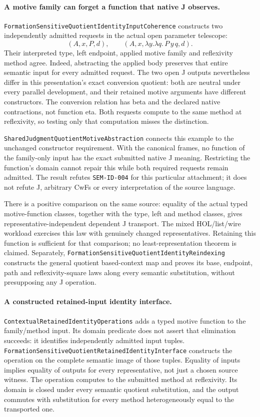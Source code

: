 \documentclass[11pt]{article}
\theoremstyle{definition}
\theoremstyle{remark}
\begin{document}
\paragraph{A motive family can forget a function that native J observes.}
\nolinkurl{FormationSensitiveQuotientIdentityInputCoherence} constructs
two independently admitted requests in the actual open parameter telescope:
\[
 (A,x,P,d),\qquad (A,x,\lambda y.\lambda q.\,P\,y\,q,d).
\]
Their interpreted type, left endpoint, applied motive family and
reflexivity method agree. Indeed, abstracting the applied body preserves
that entire semantic input for every admitted request. The two open J
outputs nevertheless differ in this presentation's exact conversion
quotient: both are neutral under every parallel development, and their
retained motive arguments have different constructors. The conversion
relation has beta and the declared native contractions, not function eta.
Both requests compute to the same method at reflexivity, so testing only
that computation misses the distinction.

\nolinkurl{SharedJudgmentQuotientMotiveAbstraction} connects this example
to the unchanged constructor requirement. With the canonical frames,
no function of the family-only input has the exact submitted native J
meaning. Restricting the function's domain cannot repair this while both
required requests remain admitted. The result refutes
\texttt{SEM-ID-004} for this particular attachment; it does not refute J,
arbitrary CwFs or every interpretation of the source language.

There is a positive comparison on the same source: equality of the actual
typed motive-function classes, together with the type, left and method
classes, gives representative-independent dependent J transport. The
mixed HOL/list/wire workload exercises this law with genuinely changed
representatives. Retaining this function is sufficient for that comparison;
no least-representation theorem is claimed.
Separately, \nolinkurl{FormationSensitiveQuotientIdentityReindexing}
constructs the general quotient based-context map and proves its base,
endpoint, path and reflexivity-square laws along every semantic
substitution, without presupposing any J operation.

\paragraph{A constructed retained-input identity interface.}
\nolinkurl{ContextualRetainedIdentityOperations} adds a typed motive
function to the family/method input. Its domain predicate does not assert
that elimination succeeds: it identifies independently admitted input
tuples. \nolinkurl{FormationSensitiveQuotientRetainedIdentityInterface}
constructs the operation on the complete semantic image of those tuples.
Equality of inputs implies equality of outputs for every representative,
not just a chosen source witness. The operation computes to the submitted
method at reflexivity. Its domain is closed under every semantic quotient
substitution, and the output commutes with substitution for every method
heterogeneously equal to the transported one.
\end{document}
